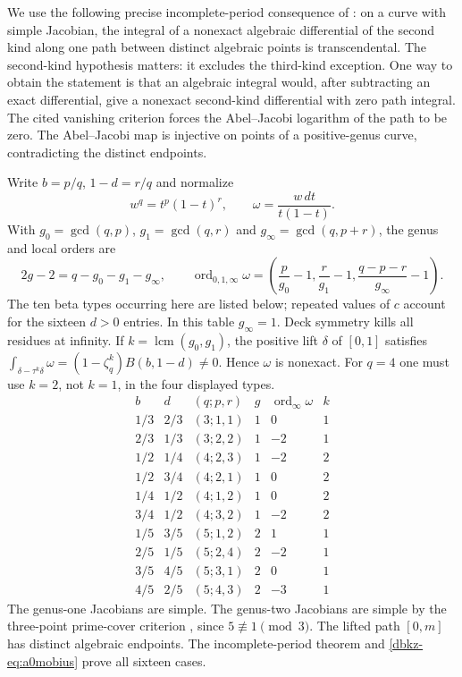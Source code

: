 \documentclass[11pt,a4paper]{article}
\theoremstyle{definition}
\theoremstyle{remark}
\numberwithin{equation}{section}
\begin{document}
We use the following precise incomplete-period consequence of
\cite[Theorem 13.9, Summaries 14.11 and 14.16, Corollary 14.22]{dbkz-hw}:
on a curve with simple Jacobian, the integral of a nonexact algebraic
differential of the second kind along one path between distinct algebraic
points is transcendental. The second-kind hypothesis matters: it excludes
the third-kind exception. One way to obtain the statement is that an
algebraic integral would, after subtracting an exact differential, give
a nonexact second-kind differential with zero path integral. The cited
vanishing criterion forces the Abel--Jacobi logarithm of the path to be
zero. The Abel--Jacobi map is injective on points of a positive-genus
curve, contradicting the distinct endpoints.

Write $b=p/q$, $1-d=r/q$ and normalize
\[
 w^q=t^p(1-t)^r,\qquad \omega=\frac{w\,dt}{t(1-t)}.
\]
With $g_0=\gcd(q,p)$, $g_1=\gcd(q,r)$ and
$g_\infty=\gcd(q,p+r)$, the genus and local orders are
\[
 2g-2=q-g_0-g_1-g_\infty,\qquad
 \operatorname{ord}_{0,1,\infty}\omega
 =\left(\frac p{g_0}-1,\frac r{g_1}-1,
           \frac{q-p-r}{g_\infty}-1\right).
\]
The ten beta types occurring here are listed below; repeated values of
$c$ account for the sixteen $d>0$ entries. In this table
$g_\infty=1$. Deck symmetry kills all residues at infinity. If
$k=\operatorname{lcm}(g_0,g_1)$, the positive lift $\delta$ of $[0,1]$
satisfies
$\int_{\delta-\tau^k\delta}\omega=(1-\zeta_q^k)B(b,1-d)\ne0$.
Hence $\omega$ is nonexact. For $q=4$ one must use $k=2$, not $k=1$,
in the four displayed types.
\[
\begin{array}{c|c|c|c|c|c}
 b&d&(q;p,r)&g&\operatorname{ord}_\infty\omega&k\\\hline
1/3&2/3&(3;1,1)&1&0&1\\
2/3&1/3&(3;2,2)&1&-2&1\\
1/2&1/4&(4;2,3)&1&-2&2\\
1/2&3/4&(4;2,1)&1&0&2\\
1/4&1/2&(4;1,2)&1&0&2\\
3/4&1/2&(4;3,2)&1&-2&2\\
1/5&3/5&(5;1,2)&2&1&1\\
2/5&1/5&(5;2,4)&2&-2&1\\
3/5&4/5&(5;3,1)&2&0&1\\
4/5&2/5&(5;4,3)&2&-3&1
\end{array}
\]
The genus-one Jacobians are simple. The genus-two Jacobians are simple
by the three-point prime-cover criterion
\cite[Corollary 19.16]{dbkz-hw}, since $5\not\equiv1\pmod3$.
The lifted path $[0,m]$ has distinct algebraic endpoints. The
incomplete-period theorem and \eqref{dbkz-eq:a0mobius} prove all sixteen
cases.
\end{document}
